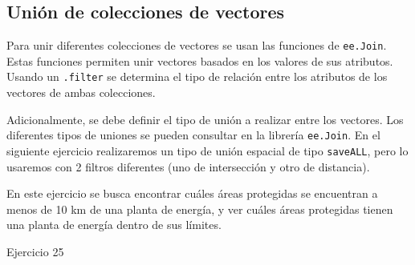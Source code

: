 \documentclass[
  12pt,
  letterpaper,
  twoside]{book}
\begin{document}
\hypertarget{uniuxf3n-de-colecciones-de-vectores}{%
\subsection{Unión de colecciones de vectores}\label{uniuxf3n-de-colecciones-de-vectores}}

Para unir diferentes colecciones de vectores se usan las funciones de \texttt{ee.Join}. Estas funciones permiten unir vectores basados en los valores de sus atributos. Usando un \texttt{.filter} se determina el tipo de relación entre los atributos de los vectores de ambas colecciones.

Adicionalmente, se debe definir el tipo de unión a realizar entre los vectores. Los diferentes tipos de uniones se pueden consultar en la librería \texttt{ee.Join}. En el siguiente ejercicio realizaremos un tipo de unión espacial de tipo \texttt{saveALL}, pero lo usaremos con 2 filtros diferentes (uno de intersección y otro de distancia).

En este ejercicio se busca encontrar cuáles áreas protegidas se encuentran a menos de 10 km de una planta de energía, y ver cuáles áreas protegidas tienen una planta de energía dentro de sus límites.

Ejercicio 25
\end{document}
